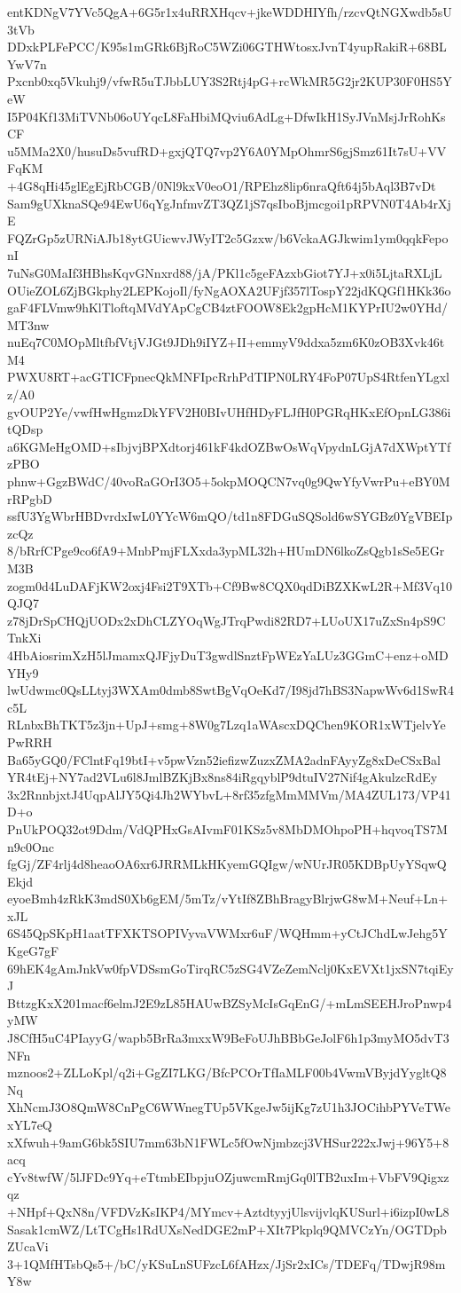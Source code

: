 entKDNgV7YVc5QgA+6G5r1x4uRRXHqcv+jkeWDDHIYfh/rzcvQtNGXwdb5sU3tVb
DDxkPLFePCC/K95s1mGRk6BjRoC5WZi06GTHWtosxJvnT4yupRakiR+68BLYwV7n
Pxcnb0xq5Vkuhj9/vfwR5uTJbbLUY3S2Rtj4pG+rcWkMR5G2jr2KUP30F0HS5YeW
I5P04Kf13MiTVNb06oUYqcL8FaHbiMQviu6AdLg+DfwIkH1SyJVnMsjJrRohKsCF
u5MMa2X0/husuDs5vufRD+gxjQTQ7vp2Y6A0YMpOhmrS6gjSmz61It7sU+VVFqKM
+4G8qHi45glEgEjRbCGB/0Nl9kxV0eoO1/RPEhz8lip6nraQft64j5bAql3B7vDt
Sam9gUXknaSQe94EwU6qYgJnfmvZT3QZ1jS7qsIboBjmcgoi1pRPVN0T4Ab4rXjE
FQZrGp5zURNiAJb18ytGUicwvJWyIT2c5Gzxw/b6VckaAGJkwim1ym0qqkFeponI
7uNsG0MaIf3HBhsKqvGNnxrd88/jA/PKl1c5geFAzxbGiot7YJ+x0i5LjtaRXLjL
OUieZOL6ZjBGkphy2LEPKojoIl/fyNgAOXA2UFjf357lTospY22jdKQGf1HKk36o
gaF4FLVmw9hKlTloftqMVdYApCgCB4ztFOOW8Ek2gpHcM1KYPrIU2w0YHd/MT3nw
nuEq7C0MOpMltfbfVtjVJGt9JDh9iIYZ+II+emmyV9ddxa5zm6K0zOB3Xvk46tM4
PWXU8RT+acGTICFpnecQkMNFIpcRrhPdTIPN0LRY4FoP07UpS4RtfenYLgxlz/A0
gvOUP2Ye/vwfHwHgmzDkYFV2H0BIvUHfHDyFLJfH0PGRqHKxEfOpnLG386itQDsp
a6KGMeHgOMD+sIbjvjBPXdtorj461kF4kdOZBwOsWqVpydnLGjA7dXWptYTfzPBO
phnw+GgzBWdC/40voRaGOrI3O5+5okpMOQCN7vq0g9QwYfyVwrPu+eBY0MrRPgbD
ssfU3YgWbrHBDvrdxIwL0YYcW6mQO/td1n8FDGuSQSold6wSYGBz0YgVBEIpzcQz
8/bRrfCPge9co6fA9+MnbPmjFLXxda3ypML32h+HUmDN6lkoZsQgb1sSe5EGrM3B
zogm0d4LuDAFjKW2oxj4Fsi2T9XTb+Cf9Bw8CQX0qdDiBZXKwL2R+Mf3Vq10QJQ7
z78jDrSpCHQjUODx2xDhCLZYOqWgJTrqPwdi82RD7+LUoUX17uZxSn4pS9CTnkXi
4HbAiosrimXzH5lJmamxQJFjyDuT3gwdlSnztFpWEzYaLUz3GGmC+enz+oMDYHy9
lwUdwmc0QsLLtyj3WXAm0dmb8SwtBgVqOeKd7/I98jd7hBS3NapwWv6d1SwR4c5L
RLnbxBhTKT5z3jn+UpJ+smg+8W0g7Lzq1aWAscxDQChen9KOR1xWTjelvYePwRRH
Ba65yGQ0/FClntFq19btI+v5pwVzn52iefizwZuzxZMA2adnFAyyZg8xDeCSxBal
YR4tEj+NY7ad2VLu6l8JmlBZKjBx8ns84iRgqyblP9dtuIV27Nif4gAkulzcRdEy
3x2RnnbjxtJ4UqpAlJY5Qi4Jh2WYbvL+8rf35zfgMmMMVm/MA4ZUL173/VP41D+o
PnUkPOQ32ot9Ddm/VdQPHxGsAIvmF01KSz5v8MbDMOhpoPH+hqvoqTS7Mn9c0Onc
fgGj/ZF4rlj4d8heaoOA6xr6JRRMLkHKyemGQIgw/wNUrJR05KDBpUyYSqwQEkjd
eyoeBmh4zRkK3mdS0Xb6gEM/5mTz/vYtIf8ZBhBragyBlrjwG8wM+Neuf+Ln+xJL
6S45QpSKpH1aatTFXKTSOPIVyvaVWMxr6uF/WQHmm+yCtJChdLwJehg5YKgeG7gF
69hEK4gAmJnkVw0fpVDSsmGoTirqRC5zSG4VZeZemNclj0KxEVXt1jxSN7tqiEyJ
BttzgKxX201macf6elmJ2E9zL85HAUwBZSyMcIsGqEnG/+mLmSEEHJroPnwp4yMW
J8CfH5uC4PIayyG/wapb5BrRa3mxxW9BeFoUJhBBbGeJolF6h1p3myMO5dvT3NFn
mznoos2+ZLLoKpl/q2i+GgZI7LKG/BfcPCOrTfIaMLF00b4VwmVByjdYygltQ8Nq
XhNcmJ3O8QmW8CnPgC6WWnegTUp5VKgeJw5ijKg7zU1h3JOCihbPYVeTWexYL7eQ
xXfwuh+9amG6bk5SIU7mm63bN1FWLc5fOwNjmbzcj3VHSur222xJwj+96Y5+8acq
cYv8twfW/5lJFDc9Yq+eTtmbEIbpjuOZjuwcmRmjGq0lTB2uxIm+VbFV9Qigxzqz
+NHpf+QxN8n/VFDVzKsIKP4/MYmcv+AztdtyyjUlsvijvlqKUSurl+i6izpI0wL8
Sasak1cmWZ/LtTCgHs1RdUXsNedDGE2mP+XIt7Pkplq9QMVCzYn/OGTDpbZUcaVi
3+1QMfHTsbQs5+/bC/yKSuLnSUFzcL6fAHzx/JjSr2xICs/TDEFq/TDwjR98mY8w
